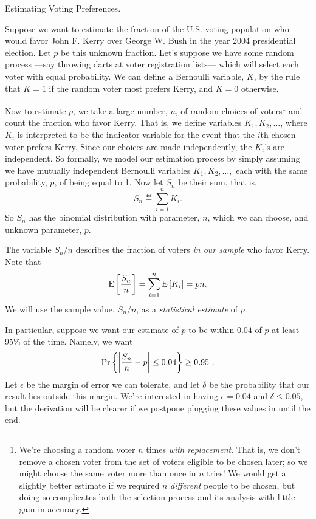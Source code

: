 \documentclass[11pt,twoside]{article}
\begin{document}
\begin{example} Estimating Voting Preferences.

Suppose we want to estimate the fraction of the U.S. voting population who
would favor John F. Kerry over George W. Bush in the year 2004
presidential election.  Let $p$ be this unknown fraction.  Let's suppose
we have some random process ---say throwing darts at voter registration
lists--- which will select each voter with equal probability.  We can
define a Bernoulli variable, $K$, by the rule that $K=1$ if the random
voter most prefers Kerry, and $K=0$ otherwise.

Now to estimate $p$, we take a large number, $n$, of random choices of
voters\footnote{We're choosing a random voter $n$ times \emph{with
replacement}.  That is, we don't remove a chosen voter from the set of
voters eligible to be chosen later; so we might choose the same voter more
than once in $n$ tries!  We would get a slightly better estimate if we
required $n$ \emph{different} people to be chosen, but doing so complicates
both the selection process and its analysis with little gain in accuracy.}
and count the fraction who favor Kerry.  That is, we define variables $K_1,
K_2, \dots$, where $K_i$ is interpreted to be the indicator variable for
the event that the $i$th chosen voter prefers Kerry.  Since our choices are
made independently, the $K_i$'s are independent.  So formally, we model our
estimation process by simply assuming we have mutually independent
Bernoulli variables $K_1, K_2, \dots,$ each with the same probability, $p$,
of being equal to 1.  Now let $S_n$ be their sum, that is,
\begin{equation}\label{Sn}
S_n \eqdef \sum_{i=1}^n K_i.
\end{equation}
So $S_n$ has the binomial distribution with parameter, $n$, which we can
choose, and unknown parameter, $p$.

The variable $S_n/n$ describes the fraction of voters \emph{in our sample}
who favor Kerry.  Note that
\[
\mathop{\textup{E}}\nolimits\left[\frac{S_n}{n}\right] = \sum_{i=1}^n \mathop{\textup{E}}\nolimits\left[K_i\right] = pn.
\]
We will use the sample value, $S_n/n$, as a \emph{statistical estimate} of
$p$.

In particular, suppose we want our estimate of $p$ to be within $0.04$
of $p$ at least 95\% of the time.  Namely, we want
\[
\pr{\abs{\frac{S_n}{n} - p} \leq 0.04} \geq 0.95\ .
\]
Let $\epsilon$ be the margin of error we can tolerate, and let $\delta$ be
the probability that our result lies outside this margin.  We're
interested in having $\epsilon = 0.04$ and $\delta \le 0.05$, but the
derivation will be clearer if we postpone plugging these values in until
the end.


\end{example}
\end{document}
